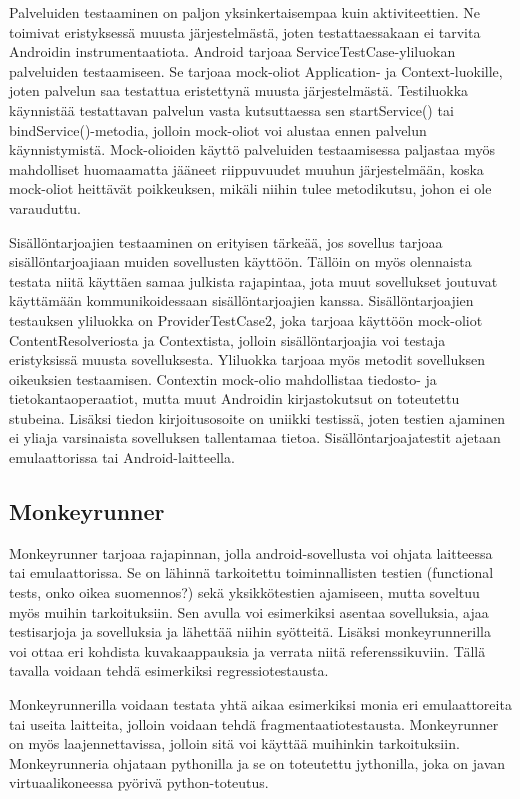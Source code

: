 Palveluiden testaaminen on paljon yksinkertaisempaa kuin aktiviteettien. Ne toimivat eristyksessä muusta järjestelmästä, joten testattaessakaan ei tarvita Androidin instrumentaatiota. Android tarjoaa ServiceTestCase-yliluokan palveluiden testaamiseen. Se tarjoaa mock-oliot Application- ja Context-luokille, joten palvelun saa testattua eristettynä muusta järjestelmästä. Testiluokka käynnistää testattavan palvelun vasta kutsuttaessa sen startService() tai bindService()-metodia, jolloin mock-oliot voi alustaa ennen palvelun käynnistymistä. Mock-olioiden käyttö palveluiden testaamisessa paljastaa myös mahdolliset huomaamatta jääneet riippuvuudet muuhun järjestelmään, koska mock-oliot heittävät poikkeuksen, mikäli niihin tulee metodikutsu, johon ei ole varauduttu.

Sisällöntarjoajien testaaminen on erityisen tärkeää, jos sovellus tarjoaa sisällöntarjoajiaan muiden sovellusten käyttöön. Tällöin on myös olennaista testata niitä käyttäen samaa julkista rajapintaa, jota muut sovellukset joutuvat käyttämään kommunikoidessaan sisällöntarjoajien kanssa. Sisällöntarjoajien testauksen yliluokka on ProviderTestCase2, joka tarjoaa käyttöön mock-oliot ContentResolveriosta ja Contextista, jolloin sisällöntarjoajia voi testaja eristyksissä muusta sovelluksesta. Yliluokka tarjoaa myös metodit sovelluksen oikeuksien testaamisen. Contextin mock-olio mahdollistaa tiedosto- ja tietokantaoperaatiot, mutta muut Androidin kirjastokutsut on toteutettu stubeina. Lisäksi tiedon kirjoitusosoite on uniikki testissä, joten testien ajaminen ei yliaja varsinaista sovelluksen tallentamaa tietoa. Sisällöntarjoajatestit ajetaan emulaattorissa tai Android-laitteella. \cite{android}

\subsection{Monkeyrunner}

Monkeyrunner tarjoaa rajapinnan, jolla android-sovellusta voi ohjata laitteessa tai emulaattorissa. Se on lähinnä tarkoitettu toiminnallisten testien (functional tests, onko oikea suomennos?) sekä yksikkötestien ajamiseen, mutta soveltuu myös muihin tarkoituksiin. Sen avulla voi esimerkiksi asentaa sovelluksia, ajaa testisarjoja ja sovelluksia ja lähettää niihin syötteitä. Lisäksi monkeyrunnerilla voi ottaa eri kohdista kuvakaappauksia ja verrata niitä referenssikuviin. Tällä tavalla voidaan tehdä esimerkiksi regressiotestausta.

Monkeyrunnerilla voidaan testata yhtä aikaa esimerkiksi monia eri emulaattoreita tai useita laitteita, jolloin voidaan tehdä fragmentaatiotestausta. Monkeyrunner on myös laajennettavissa, jolloin sitä voi käyttää muihinkin tarkoituksiin. Monkeyrunneria ohjataan pythonilla ja se on toteutettu jythonilla, joka on javan virtuaalikoneessa pyörivä python-toteutus.\cite{android}

